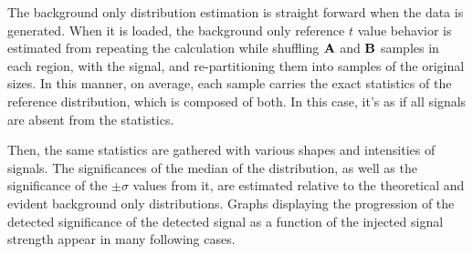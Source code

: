 \documentclass[paper/ddppaper2.tex]{subfiles}
\begin{document}
The background only distribution estimation is straight forward when the data is generated. When it is loaded, the background only reference $t$ value behavior is estimated from repeating the calculation while shuffling ${\mathbf{A}}$ and ${\mathbf{B}}$ samples in each region, with the signal, and re-partitioning them into samples of the original sizes. In this manner, on average, each sample carries the exact statistics of the reference distribution, which is composed of both. In this case, it's as if all signals are absent from the statistics.

Then, the same statistics are gathered with various shapes and intensities of signals. The significances of the median of the distribution, as well as the significance of the $\pm \sigma$ values from it, are estimated relative to the theoretical and evident background only distributions. Graphs displaying the progression of the detected significance of the detected signal as a function of the injected signal strength appear in many following cases.

\iftrue %
\par\medskip{}\medskip
\fi %

\iftrue %
\par\medskip{}\medskip
\fi %
  
\end{document}
